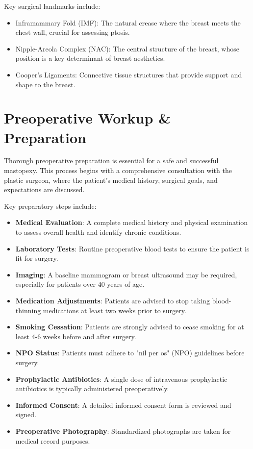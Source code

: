 Key surgical landmarks include:

\begin{itemize}
  \item Inframammary Fold (IMF): The natural crease where the breast meets the chest wall, crucial for assessing ptosis.
  \item Nipple-Areola Complex (NAC): The central structure of the breast, whose position is a key determinant of breast aesthetics.
  \item Cooper's Ligaments: Connective tissue structures that provide support and shape to the breast.
\end{itemize}

\section*{Preoperative Workup \& Preparation}
Thorough preoperative preparation is essential for a safe and successful mastopexy. This process begins with a comprehensive consultation with the plastic surgeon, where the patient's medical history, surgical goals, and expectations are discussed.

Key preparatory steps include:

\begin{itemize}
  \item \textbf{Medical Evaluation}: A complete medical history and physical examination to assess overall health and identify chronic conditions.
  
  \item \textbf{Laboratory Tests}: Routine preoperative blood tests to ensure the patient is fit for surgery.
  
  \item \textbf{Imaging}: A baseline mammogram or breast ultrasound may be required, especially for patients over 40 years of age.
  
  \item \textbf{Medication Adjustments}: Patients are advised to stop taking blood-thinning medications at least two weeks prior to surgery.
  
  \item \textbf{Smoking Cessation}: Patients are strongly advised to cease smoking for at least 4-6 weeks before and after surgery.
  
  \item \textbf{NPO Status}: Patients must adhere to "nil per os" (NPO) guidelines before surgery.
  
  \item \textbf{Prophylactic Antibiotics}: A single dose of intravenous prophylactic antibiotics is typically administered preoperatively.
  
  \item \textbf{Informed Consent}: A detailed informed consent form is reviewed and signed.
  
  \item \textbf{Preoperative Photography}: Standardized photographs are taken for medical record purposes.
\end{itemize}

